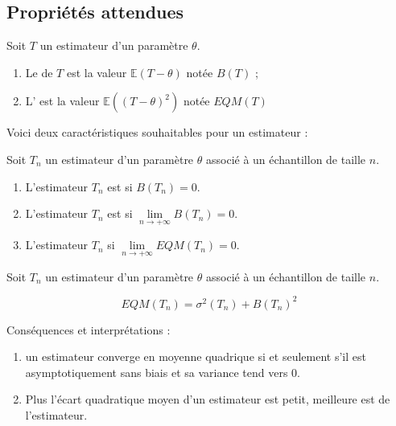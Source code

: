 \subsection{Propriétés attendues}


\begin{definition}{}{}
	Soit $T$ un estimateur d'un paramètre $\theta$.
	\begin{enumerate}
		\item Le  de $T$ est la valeur $\mathbb{E}(T-\theta)$ notée $B(T)$ ;
		\item L' est la valeur $\mathbb{E}\left((T-\theta)^2\right)$ notée $EQM(T)$
	\end{enumerate}
	
\end{definition}

Voici deux caractéristiques souhaitables pour un estimateur :

\begin{definition}{}{}
	Soit $T_n$ un estimateur d'un paramètre $\theta$ associé à un échantillon de taille $n$.
	\begin{enumerate}
		\item L'estimateur $T_n$ est  si $B(T_n)=0$.
		\item L'estimateur $T_n$ est  si $\lim\limits_{n \to +\infty}B(T_n)=0$.
		\item L'estimateur $T_n$  si $\lim\limits_{n \to +\infty} EQM(T_n) = 0$.
	\end{enumerate}
	
\end{definition}

\begin{proposition}{}{}
	Soit $T_n$ un estimateur d'un paramètre $\theta$ associé à un échantillon de taille $n$.
	
	$$EQM(T_n)=\sigma^2(T_n) + B(T_n)^2$$
\end{proposition}

Conséquences et interprétations :

\begin{enumerate}
	\item un estimateur converge en moyenne quadrique si et seulement s'il est asymptotiquement sans biais et sa variance tend vers $0$.
\item Plus l'écart quadratique moyen d'un estimateur est petit, meilleure est  de l'estimateur.
\end{enumerate}







